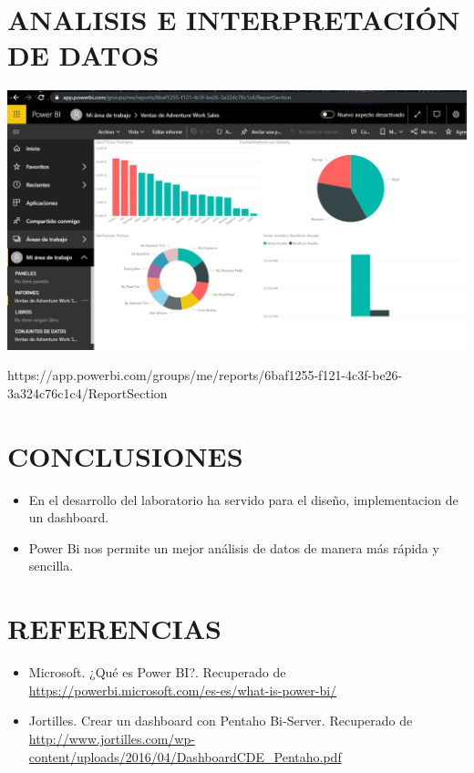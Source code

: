 \documentclass[12pt,letterpaper]{article}
\begin{document}
\section{ANALISIS E INTERPRETACIÓN DE DATOS}

	\begin{center}
	\includegraphics[width=16cm]{./Imagenes/img}
	\end{center}
\par https://app.powerbi.com/groups/me/reports/6baf1255-f121-4c3f-be26-3a324c76c1c4/ReportSection
\section{CONCLUSIONES}
\begin{itemize}
	\item En el desarrollo del laboratorio ha servido para el diseño, implementacion de un dashboard.
	\item Power Bi nos permite un mejor análisis de datos de manera más rápida y sencilla.
\end{itemize}
\section{REFERENCIAS}
\begin{itemize}
	\item Microsoft. ¿Qué es Power BI?. Recuperado de \url{https://powerbi.microsoft.com/es-es/what-is-power-bi/}
	\item Jortilles. Crear un dashboard con Pentaho Bi-Server. Recuperado de \url{http://www.jortilles.com/wp-content/uploads/2016/04/DashboardCDE_Pentaho.pdf}

\end{itemize}
\end{document}
